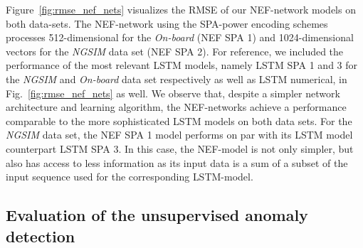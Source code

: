 Figure~\ref{fig:rmse_nef_nets} visualizes the \ac{RMSE} of our \ac{NEF}-network models on both data-sets.
The \ac{NEF}-network using the \ac{SPA}-power encoding schemes processes \num{512}-dimensional for the \emph{On-board} (\ac{NEF} \ac{SPA} \num{1}) and \num{1024}-dimensional vectors for the \emph{\ac{NGSIM}} data set (\ac{NEF} \ac{SPA} \num{2}).
For reference, we included the performance of the most relevant \ac{LSTM} models, namely \ac{LSTM} \ac{SPA} \num{1} and \num{3} for the \emph{\ac{NGSIM}} and \emph{On-board} data set respectively as well as \ac{LSTM} numerical, in Fig.~\ref{fig:rmse_nef_nets} as well.
We observe that, despite a simpler network architecture and learning algorithm, the \ac{NEF}-networks achieve a performance comparable to the more sophisticated \ac{LSTM} models on both data sets.
For the \emph{\ac{NGSIM}} data set, the \ac{NEF} \ac{SPA} \num{1} model performs on par with its \ac{LSTM} model counterpart \ac{LSTM} \ac{SPA} \num{3}.
In this case, the \ac{NEF}-model is not only simpler, but also has access to less information as its input data is a sum of a subset of the input sequence used for the corresponding \ac{LSTM}-model.

\subsection{Evaluation of the unsupervised anomaly detection}%
\label{subsec:evaluation_of_the_unsupervised_anomaly_detection}

